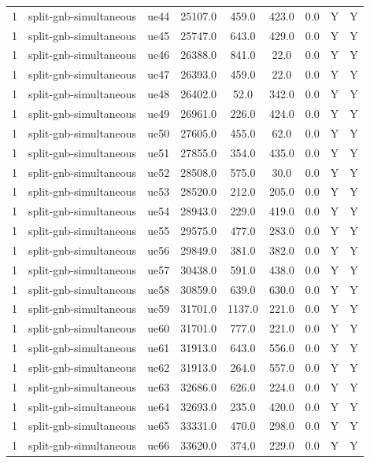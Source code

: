 \begin{table}[ht]
\begin{tabular}{|c|c|c|c|c|c|c|c|c|}
1 & split-gnb-simultaneous & ue44 & 25107.0 & 459.0 & 423.0 & 0.0 & Y & Y \\
1 & split-gnb-simultaneous & ue45 & 25747.0 & 643.0 & 429.0 & 0.0 & Y & Y \\
1 & split-gnb-simultaneous & ue46 & 26388.0 & 841.0 & 22.0 & 0.0 & Y & Y \\
1 & split-gnb-simultaneous & ue47 & 26393.0 & 459.0 & 22.0 & 0.0 & Y & Y \\
1 & split-gnb-simultaneous & ue48 & 26402.0 & 52.0 & 342.0 & 0.0 & Y & Y \\
1 & split-gnb-simultaneous & ue49 & 26961.0 & 226.0 & 424.0 & 0.0 & Y & Y \\
1 & split-gnb-simultaneous & ue50 & 27605.0 & 455.0 & 62.0 & 0.0 & Y & Y \\
1 & split-gnb-simultaneous & ue51 & 27855.0 & 354.0 & 435.0 & 0.0 & Y & Y \\
1 & split-gnb-simultaneous & ue52 & 28508.0 & 575.0 & 30.0 & 0.0 & Y & Y \\
1 & split-gnb-simultaneous & ue53 & 28520.0 & 212.0 & 205.0 & 0.0 & Y & Y \\
1 & split-gnb-simultaneous & ue54 & 28943.0 & 229.0 & 419.0 & 0.0 & Y & Y \\
1 & split-gnb-simultaneous & ue55 & 29575.0 & 477.0 & 283.0 & 0.0 & Y & Y \\
1 & split-gnb-simultaneous & ue56 & 29849.0 & 381.0 & 382.0 & 0.0 & Y & Y \\
1 & split-gnb-simultaneous & ue57 & 30438.0 & 591.0 & 438.0 & 0.0 & Y & Y \\
1 & split-gnb-simultaneous & ue58 & 30859.0 & 639.0 & 630.0 & 0.0 & Y & Y \\
1 & split-gnb-simultaneous & ue59 & 31701.0 & 1137.0 & 221.0 & 0.0 & Y & Y \\
1 & split-gnb-simultaneous & ue60 & 31701.0 & 777.0 & 221.0 & 0.0 & Y & Y \\
1 & split-gnb-simultaneous & ue61 & 31913.0 & 643.0 & 556.0 & 0.0 & Y & Y \\
1 & split-gnb-simultaneous & ue62 & 31913.0 & 264.0 & 557.0 & 0.0 & Y & Y \\
1 & split-gnb-simultaneous & ue63 & 32686.0 & 626.0 & 224.0 & 0.0 & Y & Y \\
1 & split-gnb-simultaneous & ue64 & 32693.0 & 235.0 & 420.0 & 0.0 & Y & Y \\
1 & split-gnb-simultaneous & ue65 & 33331.0 & 470.0 & 298.0 & 0.0 & Y & Y \\
1 & split-gnb-simultaneous & ue66 & 33620.0 & 374.0 & 229.0 & 0.0 & Y & Y \\

\end{tabular}
\end{table}
